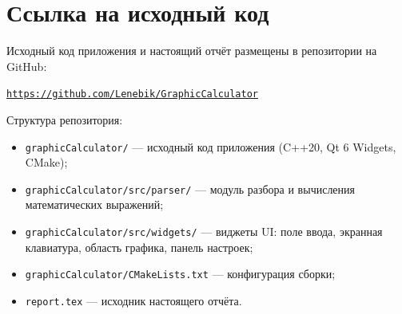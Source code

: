 \documentclass[a4paper, final]{article}
\begin{document}
\newpage

\section{Ссылка на исходный код}

Исходный код приложения и настоящий отчёт размещены в репозитории
на GitHub:

\begin{center}
\large
\href{https://github.com/Lenebik/GraphicCalculator}{\texttt{https://github.com/Lenebik/GraphicCalculator}}
\end{center}

\noindent
Структура репозитория:
\begin{itemize}
    \item \texttt{graphicCalculator/} --- исходный код приложения
          (C++20, Qt 6 Widgets, CMake);
    \item \texttt{graphicCalculator/src/parser/} --- модуль разбора
          и вычисления математических выражений;
    \item \texttt{graphicCalculator/src/widgets/} --- виджеты UI:
          поле ввода, экранная клавиатура, область графика,
          панель настроек;
    \item \texttt{graphicCalculator/CMakeLists.txt} --- конфигурация
          сборки;
    \item \texttt{report.tex} --- исходник настоящего отчёта.
\end{itemize}
\end{document}
